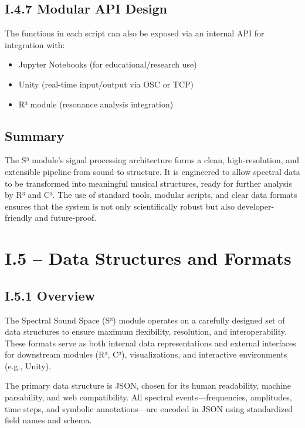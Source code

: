 \subsection*{I.4.7 Modular API Design}

The functions in each script can also be exposed via an internal API for integration with:

\begin{itemize}
    \item Jupyter Notebooks (for educational/research use)
    \item Unity (real-time input/output via OSC or TCP)
    \item R³ module (resonance analysis integration)
\end{itemize}

\subsection*{Summary}

The S³ module's signal processing architecture forms a clean, high-resolution, and extensible pipeline from sound to structure. It is engineered to allow spectral data to be transformed into meaningful musical structures, ready for further analysis by R³ and C³. The use of standard tools, modular scripts, and clear data formats ensures that the system is not only scientifically robust but also developer-friendly and future-proof.

\section*{I.5 – Data Structures and Formats}

\subsection*{I.5.1 Overview}

The Spectral Sound Space (S³) module operates on a carefully designed set of data structures to ensure maximum flexibility, resolution, and interoperability. These formats serve as both internal data representations and external interfaces for downstream modules (R³, C³), visualizations, and interactive environments (e.g., Unity).

The primary data structure is JSON, chosen for its human readability, machine parsability, and web compatibility. All spectral events—frequencies, amplitudes, time steps, and symbolic annotations—are encoded in JSON using standardized field names and schema.

